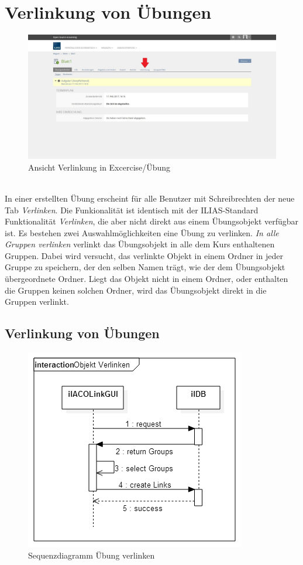 \chapter{Verlinkung von Übungen}\label{linkUebung}
\begin{figure}[h!]
	\centering
	\includegraphics[width=1\textwidth]{img/excercise.jpg}
	\caption{Ansicht Verlinkung in Excercise/Übung}
\end{figure}

~\\In einer erstellten Übung erscheint für alle Benutzer mit Schreibrechten der neue Tab \textit{Verlinken}. Die Funkionalität ist identisch mit der ILIAS-Standard Funktionalität \textit{Verlinken}, die aber nicht direkt aus einem Übungsobjekt verfügbar ist. Es bestehen zwei Auswahlmöglichkeiten eine Übung zu verlinken. \textit{In alle Gruppen verlinken} verlinkt das Übungsobjekt in alle dem Kurs enthaltenen Gruppen. Dabei wird versucht, das verlinkte Objekt in einem Ordner in jeder Gruppe zu speichern, der den selben Namen trägt, wie der dem Übungsobjekt übergeordnete Ordner. Liegt das Objekt nicht in einem Ordner, oder enthalten die Gruppen keinen solchen Ordner, wird das Übungsobjekt direkt in die Gruppen verlinkt. 
\newpage

\section{Verlinkung von Übungen}
\begin{figure}[h!]
	\centering
	\includegraphics[width=.7\textwidth]{img/seq_linkGUI.png}
	\caption{Sequenzdiagramm Übung verlinken}
\end{figure}

